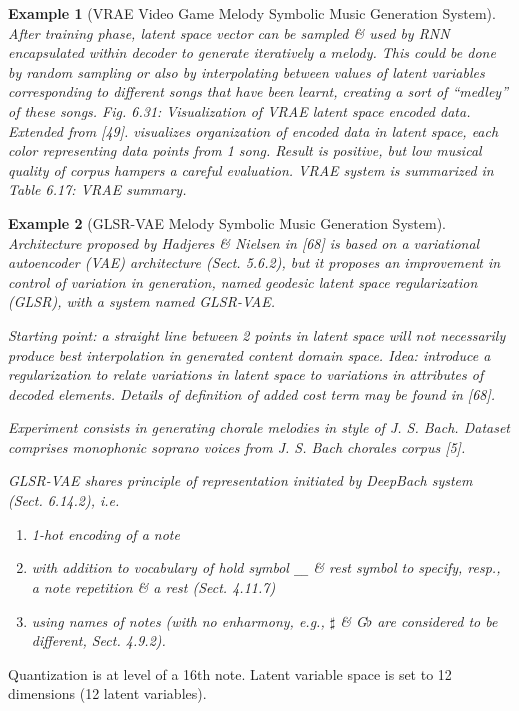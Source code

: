\documentclass{article}
\newtheorem{example}{Example}
\begin{document}
\begin{itemize}
\begin{itemize}
\begin{itemize}
\begin{itemize}
\begin{example}[VRAE Video Game Melody Symbolic Music Generation System]
					After training phase, latent space vector can be sampled \& used by RNN encapsulated within decoder to generate iteratively a melody. This could be done by random sampling or also by interpolating between values of latent variables corresponding to different songs that have been learnt, creating a sort of ``medley'' of these songs. {\sf Fig. 6.31: Visualization of VRAE latent space encoded data. Extended from [49].} visualizes organization of encoded data in latent space, each color representing data points from 1 song. Result is positive, but low musical quality of corpus hampers a careful evaluation. VRAE system is summarized in {\sf Table 6.17: VRAE summary}.
				\end{example}
				
				\begin{example}[GLSR-VAE Melody Symbolic Music Generation System]
					Architecture proposed by {\sc Hadjeres \& Nielsen} in [68] is based on a variational autoencoder (VAE) architecture (Sect. 5.6.2), but it proposes an improvement in control of variation in generation, named {\it geodesic latent space regularization} (GLSR), with a system named GLSR-VAE.
					
					Starting point: a straight line between 2 points in latent space will not necessarily produce \emph{best} interpolation in generated content domain space. Idea: introduce a regularization to relate variations in latent space to variations in attributes of decoded elements. Details of definition of added cost term may be found in [68].
					
					Experiment consists in generating chorale melodies in style of {\sc J. S. Bach}. Dataset comprises monophonic soprano voices from {\sc J. S. Bach} chorales corpus [5].
					
					GLSR-VAE shares principle of representation initiated by DeepBach system (Sect. 6.14.2), i.e.
					\begin{enumerate}
						\item 1-hot encoding of a note
						\item with addition to vocabulary of hold symbol \verb|__| \& rest symbol to specify, resp., a note repetition \& a rest (Sect. 4.11.7)
						\item using names of notes (with no enharmony, e.g., $\sharp$ \& G$\flat$ are considered to be different, Sect. 4.9.2).
					\end{enumerate}
				\end{example}
				Quantization is at level of a 16th note. Latent variable space is set to 12 dimensions (12 latent variables).
				

\end{itemize}
\end{itemize}
\end{itemize}
\end{itemize}
\end{document}
